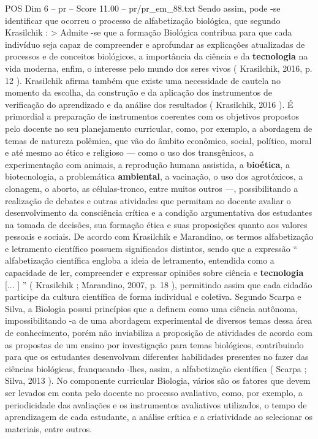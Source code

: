 \begin{textsample}{POS Dim 6 – pr – Score 11.00 – pr/pr\_em\_88.txt}
Sendo assim, pode -se identificar que ocorreu o processo de alfabetização biológica, que segundo Krasilchik : > Admite -se que a formação Biológica contribua para que cada indivíduo seja capaz de compreender e aprofundar as explicações atualizadas de processos e de conceitos biológicos, a importância da ciência e da \textbf{tecnologia} na vida moderna, enfim, o interesse pelo mundo dos seres vivos ( Krasilchik, 2016, p. 12 ).
Krasilchik afirma também que existe uma necessidade de cautela no momento da escolha, da construção e da aplicação dos instrumentos de verificação do aprendizado e da análise dos resultados ( Krasilchik, 2016 ).
É primordial a preparação de instrumentos coerentes com os objetivos propostos pelo docente no seu planejamento curricular, como, por exemplo, a abordagem de temas de natureza polêmica, que vão do âmbito econômico, social, político, moral e até mesmo ao ético e religioso — como o uso dos transgênicos, a experimentação com animais, a reprodução humana assistida, a \textbf{bioética}, a biotecnologia, a problemática \textbf{ambiental}, a vacinação, o uso dos agrotóxicos, a clonagem, o aborto, as células-tronco, entre muitos outros —, possibilitando a realização de debates e outras atividades que permitam ao docente avaliar o desenvolvimento da consciência crítica e a condição argumentativa dos estudantes na tomada de decisões, sua formação ética e suas proposições quanto aos valores pessoais e sociais.
De acordo com Krasilchik e Marandino, os termos alfabetização e letramento científico possuem significados distintos, sendo que a expressão “ alfabetização científica engloba a ideia de letramento, entendida como a capacidade de ler, compreender e expressar opiniões sobre ciência e \textbf{tecnologia} [... ] ” ( Krasilchik ; Marandino, 2007, p. 18 ), permitindo assim que cada cidadão participe da cultura científica de forma individual e coletiva.
Segundo Scarpa e Silva, a Biologia possui princípios que a definem como uma ciência autônoma, impossibilitando -a de uma abordagem experimental de diversos temas dessa área de conhecimento, porém não inviabiliza a proposição de atividades de acordo com as propostas de um ensino por investigação para temas biológicos, contribuindo para que os estudantes desenvolvam diferentes habilidades presentes no fazer das ciências biológicas, franqueando -lhes, assim, a alfabetização científica ( Scarpa ; Silva, 2013 ).
No componente curricular Biologia, vários são os fatores que devem ser levados em conta pelo docente no processo avaliativo, como, por exemplo, a periodicidade das avaliações e os instrumentos avaliativos utilizados, o tempo de aprendizagem de cada estudante, a análise crítica e a criatividade ao selecionar os materiais, entre outros.

\end{textsample}
